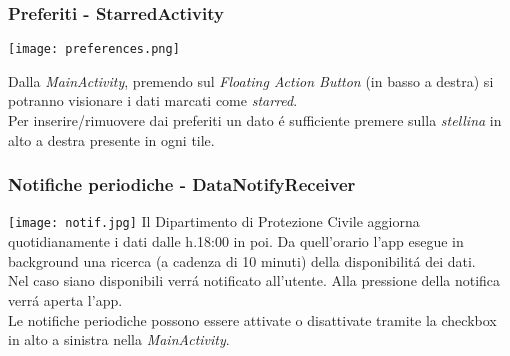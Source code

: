 \documentclass{beamer}
\begin{document}
    \begin{frame}
        \frametitle{Preferiti - StarredActivity}
        \noindent\begin{minipage}{0.3\textwidth}%
            \texttt{[image: preferences.png]}
        \end{minipage}%
        \hfill%
        \begin{minipage}{0.6\textwidth}\raggedright
            Dalla \emph{MainActivity}, premendo sul \emph{Floating Action Button} (in basso a destra) si potranno visionare i dati marcati come \emph{starred}.
            \\
            Per inserire/rimuovere dai preferiti un dato é sufficiente premere sulla \emph{stellina} in alto a destra presente in ogni tile.
        \end{minipage}
    \end{frame}

    \begin{frame}
        \frametitle{Notifiche periodiche - DataNotifyReceiver}
        \texttt{[image: notif.jpg]}
        Il Dipartimento di Protezione Civile aggiorna quotidianamente i dati dalle h.18:00 in poi.
        Da quell'orario l'app esegue in background una ricerca (a cadenza di 10 minuti) della disponibilitá dei dati.
        \\
        Nel caso siano disponibili verrá notificato all'utente. Alla pressione della notifica verrá aperta l'app.
        \\
        Le notifiche periodiche possono essere attivate o disattivate tramite la checkbox in alto a sinistra nella \emph{MainActivity}.
    \end{frame}
\end{document}
